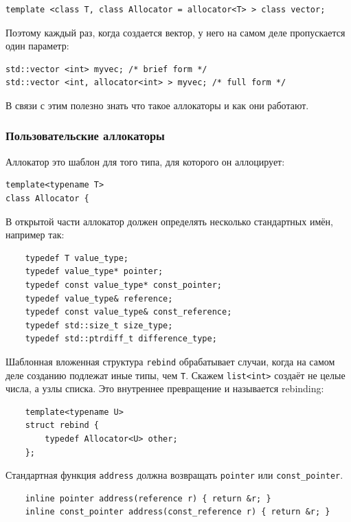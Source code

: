 \documentclass[a4paper,12pt,oneside]{article}
\begin{document}
\begin{lstlisting}
template <class T, class Allocator = allocator<T> > class vector;
\end{lstlisting}

Поэтому каждый раз, когда создается вектор, у него на самом деле пропускается один параметр:

\begin{lstlisting}
std::vector <int> myvec; /* brief form */
std::vector <int, allocator<int> > myvec; /* full form */
\end{lstlisting}

В связи с этим полезно знать что такое аллокаторы и как они работают.

\subsubsection{Пользовательские аллокаторы}

Аллокатор это шаблон для того типа, для которого он аллоцирует:

\begin{lstlisting}
template<typename T>
class Allocator {
\end{lstlisting}

В открытой части аллокатор должен определять несколько стандартных имён, например так:

\begin{lstlisting}
    typedef T value_type;
    typedef value_type* pointer;
    typedef const value_type* const_pointer;
    typedef value_type& reference;
    typedef const value_type& const_reference;
    typedef std::size_t size_type;
    typedef std::ptrdiff_t difference_type;
\end{lstlisting}

Шаблонная вложенная структура \lstinline!rebind! обрабатывает случаи, когда на самом деле созданию подлежат иные типы, чем \lstinline!T!. Скажем \lstinline!list<int>! создаёт не целые числа, а узлы списка. Это внутреннее превращение и называется rebinding:

\begin{lstlisting}
    template<typename U>
    struct rebind {
        typedef Allocator<U> other;
    };
\end{lstlisting}

Стандартная функция \lstinline!address! должна возвращать \lstinline!pointer! или \lstinline!const_pointer!.

\begin{lstlisting}
    inline pointer address(reference r) { return &r; }
    inline const_pointer address(const_reference r) { return &r; }
\end{lstlisting}
\end{document}
